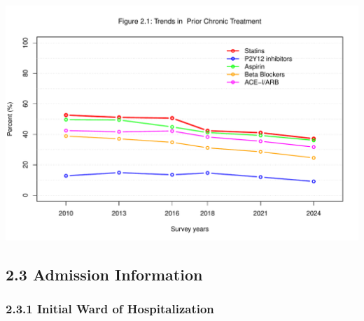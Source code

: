 \documentclass[
]{article}
\begin{document}
\hfill\break

\includegraphics{‏‏ACSIS_2024_v1_with_trend_pdf_files/figure-latex/unnamed-chunk-114-1.pdf}

\pagebreak

\subsection{2.3 Admission Information}\label{admission-information}

\subsubsection{2.3.1 Initial Ward of
Hospitalization}\label{initial-ward-of-hospitalization}
\end{document}

